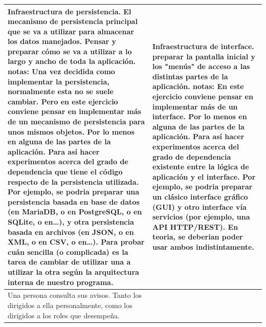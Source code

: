 \documentclass[spanish,12pt,a4paper,final,oneside]{book}
\begin{document}
\begin{longtable}{|p{7cm}|p{7cm}|}
\\ \hline

Infraestructura de persistencia.
\newline \newline
El mecanismo de persistencia principal que se va a utilizar para almacenar los datos manejados.
\newline
Pensar y preparar cómo se va a utilizar a lo largo y ancho de toda la aplicación.
\newline \newline
notas: 
Una vez decidida como implementar la persistencia, normalmente esta no se suele cambiar.
Pero en este ejercicio conviene pensar en implementar más de un mecanismo de persistencia para unos mismos objetos. Por lo menos en alguna de las partes de la aplicación. Para así hacer experimentos acerca del grado de dependencia que tiene el código respecto de la persistencia utilizada.
\newline
Por ejemplo, se podria preparar una persistencia basada en base de datos (en MariaDB, o en PostgreSQL, o en SQLite, o en\ldots), y otra persistencia basada en archivos (en JSON, o en XML, o en CSV, o en\ldots). Para probar cuán sencilla (o complicada) es la tarea de cambiar de utilizar una a utilizar la otra según la arquitectura interna de nuestro programa.

&

Infraestructura de interface.
\newline \newline
preparar la pantalla inicial y los "menús" de acceso a las distintas partes de la aplicación.
\newline \newline
notas: 
En este ejercicio conviene pensar en implementar más de un interface. Por lo menos en alguna de las partes de la aplicación. Para así hacer experimentos acerca del grado de dependencia existente entre la lógica de aplicación y el interface.
\newline
Por ejemplo, se podria preparar un clásico interface gráfico (GUI) y otro interface vía servicios (por ejemplo, una API HTTP/REST). En teoria, se deberian poder usar ambos indistintamente.

\\ \hline

Una persona consulta sus avisos.
\newline \newline
Tanto los dirigidos a ella personalmente, como los dirigidos a los roles que desempeña.


\end{longtable}
\end{document}
